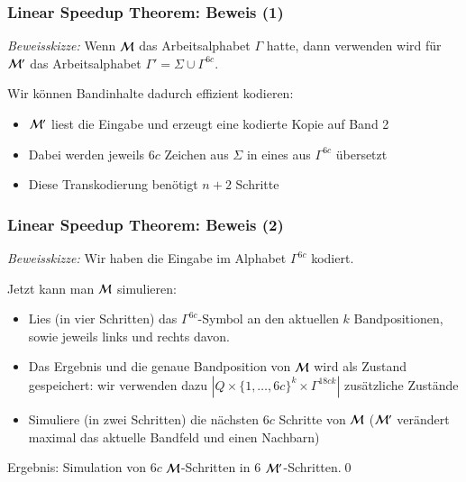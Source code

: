 \documentclass[aspectratio=1610,onlymath]{beamer}
\begin{document}
\begin{frame}\frametitle{Linear Speedup Theorem: Beweis (1)}


\pause\emph{Beweisskizze:} Wenn $\mathcal{M}$ das Arbeitsalphabet $\Gamma$ hatte, dann verwenden wird für $\mathcal{M}'$ das Arbeitsalphabet $\Gamma'=\Sigma\cup\Gamma^{6c}$.
\bigskip

Wir können Bandinhalte dadurch effizient kodieren:
\begin{itemize}
\item $\mathcal{M}'$ liest die Eingabe und erzeugt eine kodierte Kopie auf Band 2
\item Dabei werden jeweils $6c$ Zeichen aus $\Sigma$ in eines aus $\Gamma^{6c}$ übersetzt
\item Diese Transkodierung benötigt $n+2$ Schritte
\end{itemize}


\end{frame}

\begin{frame}\frametitle{Linear Speedup Theorem: Beweis (2)}


\emph{Beweisskizze:} Wir haben die Eingabe im Alphabet $\Gamma^{6c}$ kodiert.
\pause\medskip

Jetzt kann man $\mathcal{M}$ simulieren:
\begin{itemize}
\item Lies (in vier Schritten) das $\Gamma^{6c}$-Symbol an den aktuellen $k$ Bandpositionen,
sowie jeweils links und rechts davon. 
\item Das Ergebnis und die genaue Bandposition von $\mathcal{M}$ wird als Zustand gespeichert: wir verwenden dazu
$|Q\times\{1,\ldots,6c\}^k\times \Gamma^{18c k}|$ zusätzliche Zustände
\item Simuliere (in zwei Schritten) die nächsten $6c$ Schritte von $\mathcal{M}$
($\mathcal{M}'$ verändert maximal das aktuelle Bandfeld und einen Nachbarn)
\end{itemize}
Ergebnis: Simulation von $6c$ $\mathcal{M}$-Schritten in $6$ $\mathcal{M}'$-Schritten.\qed

\end{frame}
\end{document}
